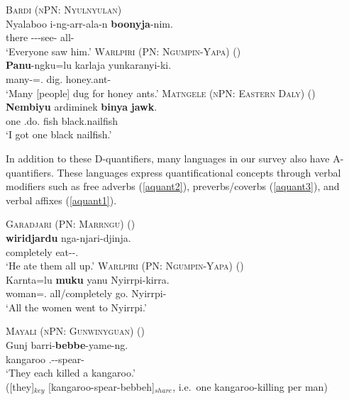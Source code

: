 \documentclass[12pt,egregdoesnotlikesansseriftitles]{scrartcl}
\begin{document}
\begin{exe}
  \ex\label{allerg} \textsc{Bardi (nPN: Nyulnyulan)}\hfill {}\\
  \gll Nyalaboo i-ng-arr-ala-n \textbf{boonyja}-nim.\\
  there \Third-\Pst-\Aug-see-\Rempst{} all-\Erg\\
  \glt `Everyone saw him.'
  \ex \textsc{Warlpiri (PN: Ngumpin-Yapa)} \hfill(\citealt[967]{bowler17})\\
  \gll \textbf{Panu}-ngku=lu karlaja yunkaranyi-ki.\\
  many-\Erg=\Tpl.\Sarg{} dig.\Pst{} honey.ant-\Dat\\
  \glt `Many [people] dug for honey ants.' \label{agrmarking1}
  \ex \textsc{Matngele (nPN: Eastern Daly)} \hfill(\citealt[54]{zandvoort99})\\
  \gll \textbf{Nembiyu} ardiminek \textbf{binya} \textbf{jawk}.\\
  one \First\Min\Sarg.do.\Pst{} fish black.nailfish\\
  \glt `I got one black nailfish.'  \label{discconst}
\end{exe}


In addition to these D-quantifiers, many languages in our survey also have A-quantifiers. These languages express quantificational concepts through verbal modifiers such as free adverbs (\ref{aquant2}), preverbs/coverbs (\ref{aquant3}), and verbal affixes (\ref{aquant1}).
\begin{exe}
  \ex\textsc{Garadjari (PN: Marrngu)} \hfill(\citealt[54]{sands89})\\
  \gll \textbf{wiridjardu}  nga-njari-djinja.\\
  completely  eat-\Cont-\Tpl.\Parg\\
  \glt `He ate them all up.' \label{aquant2}
  \ex \textsc{Warlpiri (PN: Ngumpin-Yapa)} \hfill (\citealt[975]{bowler17})\\
  \gll Karnta=lu \textbf{muku} yanu Nyirrpi-kirra.\\
  woman=\Tpl.\Sarg{} all/completely go.\Pst{} Nyirrpi-\All\\
  
  `All the women went to Nyirrpi.'\label{aquant3}

  \ex \textsc{Mayali (nPN: Gunwinyguan)} \hfill(\citealt[221]{evans95})\\
  \gll Gunj barri-\textbf{bebbe}-yame-ng.\\
  kangaroo \Third.\Aug-\Distr-spear-\Pp\\
  \glt `They each killed a kangaroo.'\\
  ([they]$_{key}$ [kangaroo-spear-bebbeh]$_{share}$, i.e.\ one kangaroo-killing per man) \label{aquant1}
\end{exe}
\end{document}
